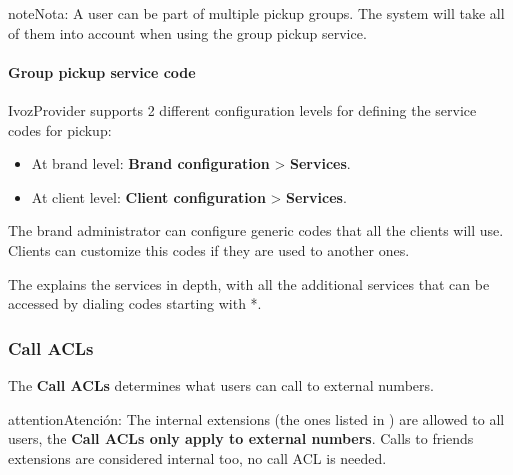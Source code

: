 \documentclass[letterpaper,10pt,spanish]{sphinxmanual}
\begin{document}
\begin{notice}{note}{Nota:}
A user can be part of multiple pickup groups. The system will take
all of them into account when using the group pickup service.
\end{notice}


\paragraph{Group pickup service code}
\label{administration_portal/client/vpbx/user_configuration/pick_up_groups:group-pickup-service-code}
IvozProvider supports 2 different configuration levels for defining the service
codes for pickup:
\begin{itemize}
\item {} 
At brand level: \textbf{Brand configuration} \textgreater{} \textbf{Services}.

\item {} 
At client level: \textbf{Client configuration} \textgreater{} \textbf{Services}.

\end{itemize}

The brand administrator can configure generic codes that all the clients will
use. Clients can customize this codes if they are used to another ones.

The {\hyperref[administration_portal/client/vpbx/services:services]{}} explains the services in depth, with
all the additional services that can be accessed by dialing codes starting with
*.


\subsubsection{Call ACLs}
\label{administration_portal/client/vpbx/user_configuration/call_acls:call-permissions}\label{administration_portal/client/vpbx/user_configuration/call_acls::doc}\label{administration_portal/client/vpbx/user_configuration/call_acls:call-acls}
The \textbf{Call ACLs} determines what users can call to external numbers.

\begin{notice}{attention}{Atención:}
The internal extensions (the ones listed in {\hyperref[administration_portal/client/vpbx/extensions:extensions]{}}) are allowed to all users, the \textbf{Call
ACLs only apply to external numbers}. Calls to friends extensions are considered internal too, no call ACL is needed.
\end{notice}
\end{document}
